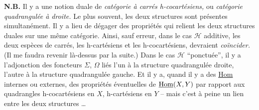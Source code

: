 
\textbf{N.B.} Il y a une notion duale de \textit{catégorie à carrés h-cocartésiens,} ou \textit{catégorie quadrangulée à droite.} Le plus souvent, les deux structures sont présentes simultanément. Il y a lieu de dégager des propriétés qui relient les deux structures duales sur une même catégorie. Ainsi, sauf erreur, dans le cas $\mathcal{H}$ additive, les deux espèces de carrés, les h-cartésiens et les h-cocartésiens, devraient \textit{coïncider.} (Il me faudra revenir là-dessus par la suite.) Dans le cas $\mathcal{H}$ ``ponctuée'', il y a l'adjonction des foncteurs $\Sigma$, $\Omega$ liés l'un à la structure quadrangulée droite, l'autre à la structure quadrangulée gauche. Et il y a, quand il y a des \underline{Hom} internes ou externes, des propriétés éventuelles de $\underline{\mathrm{Hom}}(X,Y)$ par rapport aux quadrangles h-cocartésiens en $X$, h-cartésiens en $Y$ -- mais c'est à peine un lien entre les deux structures \ldots

